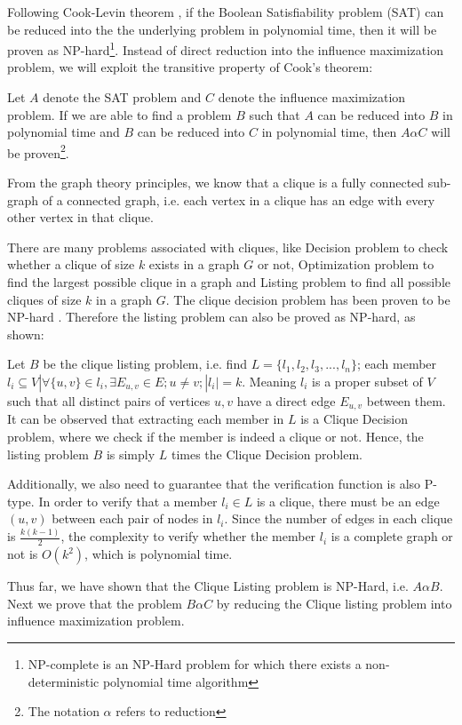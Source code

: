 	Following Cook-Levin theorem \cite{cook1971}, if the Boolean Satisfiability problem (SAT) can be reduced into the the underlying problem in polynomial time, then it will be proven as NP-hard\footnote{NP-complete is an NP-Hard problem for which there exists a non-deterministic polynomial time algorithm}. Instead of direct reduction into the influence maximization problem, we will exploit the transitive property of Cook's theorem:
	
	Let $A$ denote the SAT problem and $C$ denote the influence maximization problem. If we are able to find a problem $B$ such that $A$ can be reduced into $B$ in polynomial time and $B$ can be reduced into $C$ in polynomial time, then $A \alpha C$ will be proven\footnote{The notation $\alpha$ refers to reduction}.
	
	From the graph theory principles, we know that a clique is a fully connected sub-graph of a connected graph, i.e. each vertex in a clique has an edge with every other vertex in that clique.
	
	There are many problems associated with cliques, like Decision problem to check whether a clique of size $k$ exists in a graph $G$ or not, Optimization problem to find the largest possible clique in a graph and Listing problem to find all possible cliques of size $k$ in a graph $G$. The clique decision problem has been proven to be NP-hard \cite{karp1972}. Therefore the listing problem can also be proved as NP-hard, as shown:
	
	Let $B$ be the clique listing problem, i.e. find $L=\{l_1,l_2,l_3,...,l_n\}$; each member $l_i\subseteq V|\forall \{u,v\}\in l_i,\exists E_{u,v}\in E;u\neq v;|l_i|=k$. Meaning $l_i$ is a proper subset of $V$ such that all distinct pairs of vertices $u,v$ have a direct edge $E_{u,v}$ between them. It can be observed that extracting each member in $L$ is a Clique Decision problem, where we check if the member is indeed a clique or not. Hence, the listing problem $B$ is simply $L$ times the Clique Decision problem.
	
	Additionally, we also need to guarantee that the verification function is also P-type. In order to verify that a member $l_i\in L$ is a clique, there must be an edge $(u,v)$ between each pair of nodes in $l_i$. Since the number of edges in each clique is $\frac{k(k-1)}{2}$, the complexity to verify whether the member $l_i$ is a complete graph or not is $O(k^2)$, which is polynomial time.
	
	Thus far, we have shown that the Clique Listing problem is NP-Hard, i.e. $A \alpha B$. Next we prove that the problem $B \alpha C$ by reducing the Clique listing problem into influence maximization problem.
	

